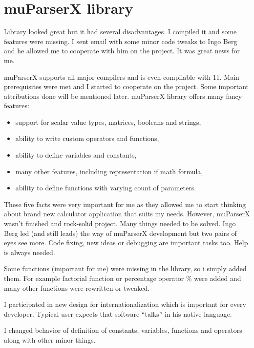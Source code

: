 \chapter{muParserX library}
Library looked great but it had several disadvantages. I compiled it and some features were missing. I sent email with some minor code tweaks to Ingo Berg and he allowed me to cooperate with him on the project. It was great news for me.

muParserX supports all major compilers and is even compilable with \cpp{} 11. Main prerequisites were met and I started to cooperate on the project. Some important attributions done will be mentioned later. muParserX library offers many fancy features:
\begin{itemize}
\item support for scalar value types, matrices, booleans and strings,
\item ability to write custom operators and functions,
\item ability to define variables and constants,
\item many other features, including  representation if math formula,
\item ability to define functions with varying count of parameters.
\end{itemize}

These five facts were very important for me as they allowed me to start thinking about brand new calculator application that suits my needs. However, muParserX wasn't finished and rock-solid project. Many things needed to be solved. Ingo Berg led (and still leads) the way of muParserX development but two pairs of eyes see more. Code fixing, new ideas or debugging are important tasks too. Help is always needed.

Some functions (important for me) were missing in the library, so i simply added them. For example factorial function or percentage operator \% were added	and many other functions were rewritten or tweaked.

I participated in new design for internationalization which is important for every developer. Typical user expects that software \enquote{talks} in his native language.

I changed behavior of definition of constants, variables, functions and operators along with other minor things.


